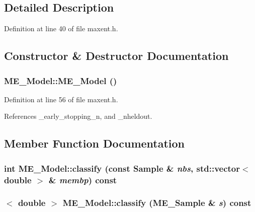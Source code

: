 \subsection{Detailed Description}


Definition at line 40 of file maxent.h.

\subsection{Constructor \& Destructor Documentation}
\hypertarget{classME__Model_8f611394be442ebd07ef20cb866e09ee}{
\subsubsection[{ME\_\-Model}]{\setlength{\rightskip}{0pt plus 5cm}ME\_\-Model::ME\_\-Model ()}}
\label{classME__Model_8f611394be442ebd07ef20cb866e09ee}




Definition at line 56 of file maxent.h.

References \_\-early\_\-stopping\_\-n, and \_\-nheldout.

\subsection{Member Function Documentation}
\hypertarget{classME__Model_5683347be55aef212b56dec1fdf54a37}{
\subsubsection[{classify}]{\setlength{\rightskip}{0pt plus 5cm}int ME\_\-Model::classify (const {\bf Sample} \& {\em nbs}, \/  std::vector$<$ double $>$ \& {\em membp}) const}}
\label{classME__Model_5683347be55aef212b56dec1fdf54a37}


\hypertarget{classME__Model_28a77dc1738038d8a5a1350e157428c4}{
\subsubsection[{classify}]{$<$ double $>$ ME\_\-Model::classify ({\bf ME\_\-Sample} \& {\em s}) const}}
\label{classME__Model_28a77dc1738038d8a5a1350e157428c4}




